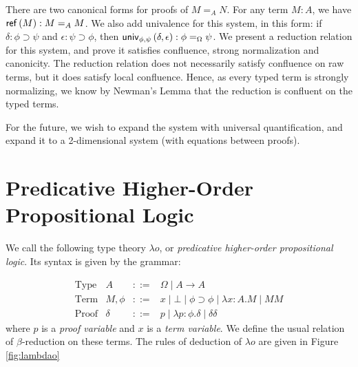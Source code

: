 There are two canonical forms for proofs of $M =_A N$.  For any term $M : A$, we have $\mathsf{ref} \left( {M} \right) : M =_A M$.  We also add univalence for this system, in this form:
if $\delta : \phi \supset \psi$ and $\epsilon : \psi \supset\phi$, then $\mathsf{univ}_{{\phi} , {\psi}} \left( {\delta} , {\epsilon} \right) : \phi =_\Omega \psi$.  We present a reduction relation for this system, and prove it satisfies confluence, strong normalization and canonicity.   The reduction relation does not necessarily satisfy confluence on raw terms, but it does satisfy local confluence.  Hence, as
every typed term is strongly normalizing, we know by Newman's Lemma that the reduction is confluent on the typed terms.

For the future, we wish to expand the system with universal quantification, and expand it to a 2-dimensional system (with equations between proofs).


\section{Predicative Higher-Order Propositional Logic}

We call the following type theory $\lambda o$, or \emph{predicative higher-order propositional logic}.  Its
syntax is given by the grammar:

\[
\begin{array}{lrcl}
\text{Type} & A & ::= & \Omega \mid A \rightarrow A \\
\text{Term} & M, \phi & ::= & x \mid \bot \mid \phi \supset\phi \mid \lambda x:A.M \mid MM \\
\text{Proof} & \delta & ::= & p \mid \lambda p:\phi.\delta \mid \delta \delta
\end{array}
\]
where $p$ is a \emph{proof variable} and $x$ is a \emph{term variable}.  We define the usual relation of $\beta$-reduction on these terms.
The rules of deduction of $\lambda o$ are given in Figure \ref{fig:lambdao}

